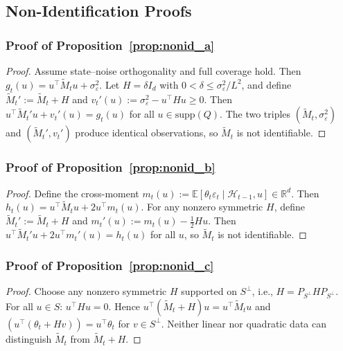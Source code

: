 \documentclass{article}
\newcommand{\R}{\mathbb{R}}
\newcommand{\E}{\mathbb{E}}
\newcommand{\cH}{\mathcal{H}}
\newcommand{\supp}{\mathrm{supp}}
\begin{document}
\subsection{Non-Identification Proofs}

\subsubsection{Proof of Proposition~\ref{prop:nonid_a}}
\label{proof:nonid_a}

\begin{proof}
Assume state--noise orthogonality and full coverage hold. Then $g_t(u) = u^\top \widetilde{M}_t u + \sigma_\varepsilon^2$.
Let $H = \delta I_d$ with $0 < \delta \le \sigma_\varepsilon^2/L^2$, and define $\widetilde{M}_t' := \widetilde{M}_t + H$ and $v_t'(u) := \sigma_\varepsilon^2 - u^\top H u \ge 0$.
Then $u^\top \widetilde{M}_t' u + v_t'(u) = g_t(u)$ for all $u \in \supp(Q)$.
The two triples $(\widetilde{M}_t, \sigma_\varepsilon^2)$ and $(\widetilde{M}_t', v_t')$ produce identical observations, so $\widetilde{M}_t$ is not identifiable.
\end{proof}

\subsubsection{Proof of Proposition~\ref{prop:nonid_b}}
\label{proof:nonid_b}

\begin{proof}
Define the cross-moment $m_t(u) := \E[\theta_t \varepsilon_t \mid \cH_{t-1}, u] \in \R^d$.
Then $h_t(u) = u^\top \widetilde{M}_t u + 2u^\top m_t(u)$.
For any nonzero symmetric $H$, define $\widetilde{M}_t' := \widetilde{M}_t + H$ and $m_t'(u) := m_t(u) - \tfrac{1}{2}Hu$.
Then $u^\top \widetilde{M}_t' u + 2u^\top m_t'(u) = h_t(u)$ for all $u$, so $\widetilde{M}_t$ is not identifiable.
\end{proof}

\subsubsection{Proof of Proposition~\ref{prop:nonid_c}}
\label{proof:nonid_c}

\begin{proof}
Choose any nonzero symmetric $H$ supported on $S^\perp$, i.e., $H = P_{S^\perp} H P_{S^\perp}$.
For all $u \in S$: $u^\top H u = 0$.
Hence $u^\top(\widetilde{M}_t + H)u = u^\top \widetilde{M}_t u$ and $(u^\top(\theta_t + Hv)) = u^\top \theta_t$ for $v \in S^\perp$.
Neither linear nor quadratic data can distinguish $\widetilde{M}_t$ from $\widetilde{M}_t + H$.
\end{proof}
\end{document}
